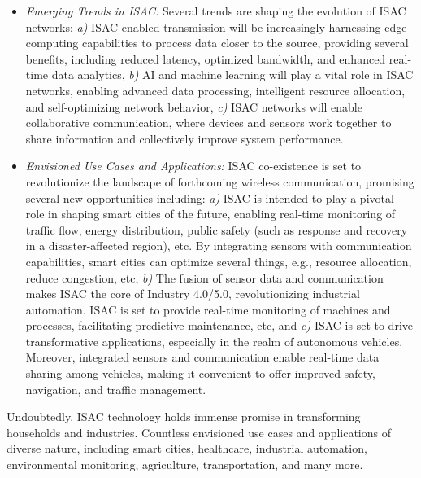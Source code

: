 \documentclass[journal, comsoc]{IEEEtran}
\begin{document}
\begin{itemize}
    \item \textit{Emerging Trends in ISAC:} Several trends are shaping the evolution of ISAC networks: \textit{a)}	ISAC-enabled transmission will be increasingly harnessing edge computing capabilities to process data closer to the source, providing several benefits, including reduced latency, optimized bandwidth, and enhanced real-time data analytics, \textit{b)} AI and machine learning will play a vital role in ISAC networks, enabling advanced data processing, intelligent resource allocation, and self-optimizing network behavior, \textit{c)}
ISAC networks will enable collaborative communication, where devices and sensors work together to share information and collectively improve system performance. 

\item \textit{Envisioned Use Cases and Applications:} ISAC co-existence is set to revolutionize the landscape of forthcoming wireless communication, promising several new opportunities including: \textit{a)} ISAC is intended to play a pivotal role in shaping smart cities of the future, enabling real-time monitoring of traffic flow, energy distribution, public safety (such as response and recovery in a disaster-affected region), etc. By integrating sensors with communication capabilities, smart cities can optimize several things, e.g., resource allocation, reduce congestion, etc, \textit{b)} The fusion of sensor data and communication makes ISAC the core of Industry 4.0/5.0, revolutionizing industrial automation. ISAC is set to provide real-time monitoring of machines and processes, facilitating predictive maintenance, etc, and \textit{c)} ISAC is set to drive transformative applications, especially in the realm of autonomous vehicles. Moreover, integrated sensors and communication enable real-time data sharing among vehicles, making it convenient to offer improved safety, navigation, and traffic management. 
\end{itemize}

Undoubtedly, ISAC technology holds immense promise in transforming households and industries. Countless envisioned use cases and applications of diverse nature, including smart cities, healthcare, industrial automation, environmental monitoring, agriculture, transportation, and many more. 
\end{document}

